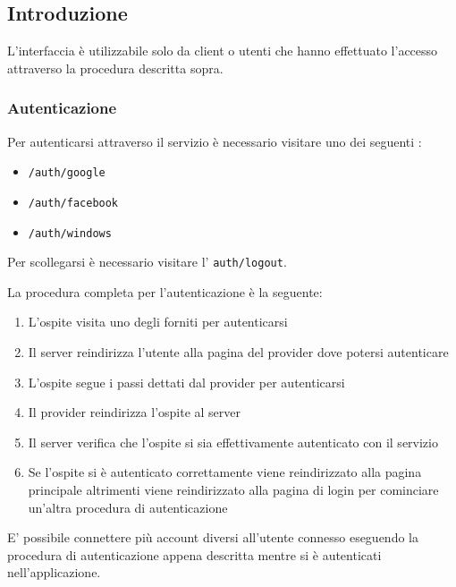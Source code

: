 \subsection{Introduzione}

    L'interfaccia  è utilizzabile solo da client o utenti che hanno effettuato l'accesso
    attraverso la procedura descritta sopra.

    \subsubsection{Autenticazione}

        Per autenticarsi attraverso il servizio è necessario visitare uno dei seguenti :

        \begin{itemize}
            \item \texttt{/auth/google}
            \item \texttt{/auth/facebook}
            \item \texttt{/auth/windows}
        \end{itemize}

        Per scollegarsi è necessario visitare l' \texttt{auth/logout}.

        La procedura completa per l'autenticazione è la seguente:

        \begin{enumerate}
            \item L'ospite visita uno degli  forniti per autenticarsi
            \item Il server reindirizza l'utente alla pagina del provider dove potersi autenticare
            \item L'ospite segue i passi dettati dal provider per autenticarsi
            \item Il provider reindirizza l'ospite al server
            \item Il server verifica che l'ospite si sia effettivamente autenticato con il servizio
            \item Se l'ospite si è autenticato correttamente viene reindirizzato alla pagina principale
                altrimenti viene reindirizzato alla pagina di login per cominciare un'altra procedura di
                autenticazione
        \end{enumerate}

        E' possibile connettere più account diversi all'utente connesso eseguendo la procedura
        di autenticazione appena descritta mentre si è autenticati nell'applicazione.

